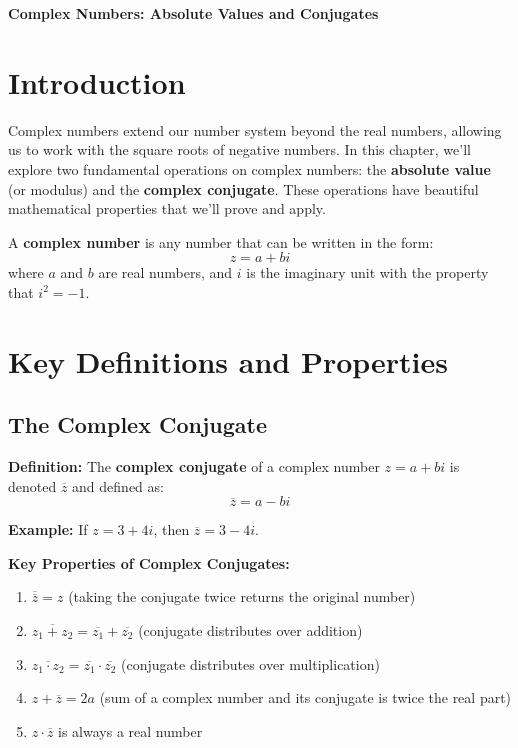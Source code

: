 \documentclass[12pt]{article}
\begin{document}
\begin{center}
\textbf{\Large Complex Numbers: Absolute Values and Conjugates} \\
\vspace{0.5cm}
\hspace{0.1\textwidth}
\end{center}

\vspace{0.5cm}

\section{Introduction}

Complex numbers extend our number system beyond the real numbers, allowing us to work with the square roots of negative numbers. In this chapter, we'll explore two fundamental operations on complex numbers: the \textbf{absolute value} (or modulus) and the \textbf{complex conjugate}. These operations have beautiful mathematical properties that we'll prove and apply.

A \textbf{complex number} is any number that can be written in the form:
$$z = a + bi$$
where $a$ and $b$ are real numbers, and $i$ is the imaginary unit with the property that $i^2 = -1$.

\section{Key Definitions and Properties}

\subsection{The Complex Conjugate}

\textbf{Definition:} The \textbf{complex conjugate} of a complex number $z = a + bi$ is denoted $\overline{z}$ and defined as:
$$\overline{z} = a - bi$$

\textbf{Example:} If $z = 3 + 4i$, then $\overline{z} = 3 - 4i$.

\textbf{Key Properties of Complex Conjugates:}
\begin{enumerate}
\item $\overline{\overline{z}} = z$ (taking the conjugate twice returns the original number)
\item $\overline{z_1 + z_2} = \overline{z_1} + \overline{z_2}$ (conjugate distributes over addition)
\item $\overline{z_1 \cdot z_2} = \overline{z_1} \cdot \overline{z_2}$ (conjugate distributes over multiplication)
\item $z + \overline{z} = 2a$ (sum of a complex number and its conjugate is twice the real part)
\item $z \cdot \overline{z}$ is always a real number
\end{enumerate}
\end{document}

